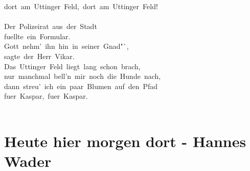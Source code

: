 \documentclass[]{book}
\let\stdsection\section
\renewcommand\section{\clearpage\stdsection}
\begin{document}
dort~am~Uttinger~Feld,~dort~am~Uttinger~Feld!\\
~\\
Der~Polizeirat~aus~der~Stadt\\
fuellte~ein~Formular.\\
Gott~nehm'~ihn~hin~in~seiner~Gnad"`,\\
sagte~der~Herr~Vikar.\\
Das~Uttinger~Feld~liegt~lang~schon~brach,\\
nur~manchmal~bell'n~mir~noch~die~Hunde~nach,\\
dann~streu'~ich~ein~paar~Blumen~auf~den~Pfad\\
fuer~Kaspar,~fuer~Kaspar.~\\
~\\

\hypertarget{heute-hier-morgen-dort---hannes-wader}{%
\section{Heute hier morgen dort - Hannes Wader}\label{heute-hier-morgen-dort---hannes-wader}}
\end{document}

